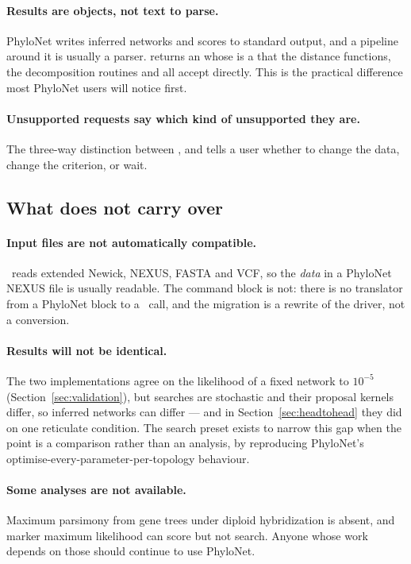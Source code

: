 \paragraph{Results are objects, not text to parse.}
PhyloNet writes inferred networks and scores to standard output, and a pipeline
around it is usually a parser.  returns an 
whose  is a  that the distance functions, the
decomposition routines and  all accept directly. This is the
practical difference most PhyloNet users will notice first.

\paragraph{Unsupported requests say which kind of unsupported they are.}
The three-way distinction between ,  and
 tells a user whether to change the data, change the
criterion, or wait.

\subsection{What does not carry over}

\paragraph{Input files are not automatically compatible.}
\phynetpy\ reads extended Newick, NEXUS, FASTA and VCF, so the \emph{data} in a
PhyloNet NEXUS file is usually readable. The  command block is
not: there is no translator from a PhyloNet block to a \phynetpy\ call, and the
migration is a rewrite of the driver, not a conversion.

\paragraph{Results will not be identical.}
The two implementations agree on the likelihood of a fixed network to $10^{-5}$
(Section~\ref{sec:validation}), but searches are stochastic and their proposal
kernels differ, so inferred networks can differ --- and in
Section~\ref{sec:headtohead} they did on one reticulate condition. The
 search preset exists to narrow this gap when the point is a
comparison rather than an analysis, by reproducing PhyloNet's
optimise-every-parameter-per-topology behaviour.

\paragraph{Some analyses are not available.}
Maximum parsimony from gene trees under diploid hybridization is absent, and
marker maximum likelihood can score but not search. Anyone whose work depends on
those should continue to use PhyloNet.

